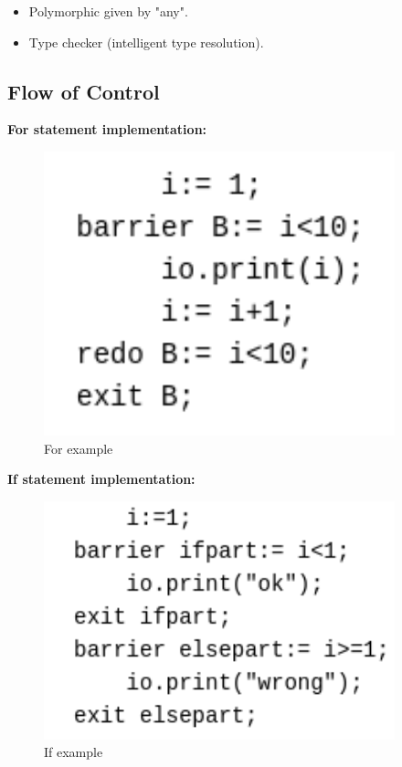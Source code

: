 \documentclass[11pt]{article}
\begin{document}
\begin{itemize}
\item Polymorphic given by "any".
\item Type checker (intelligent type resolution).
\end{itemize}

\subsection{Flow of Control}
\label{sec:org2f14421}

\textbf{For statement implementation:}
\begin{figure}[htbp]
\centering
\includegraphics[width=4.0in]{./Pictures/for-ex.png}
\caption{\label{fig:orgcde0b29}
For example}
\end{figure}

\textbf{If statement implementation:}
\begin{figure}[htbp]
\centering
\includegraphics[width=4.0in]{./Pictures/if-ex.png}
\caption{\label{fig:org210eeaf}
If example}
\end{figure}
\end{document}
